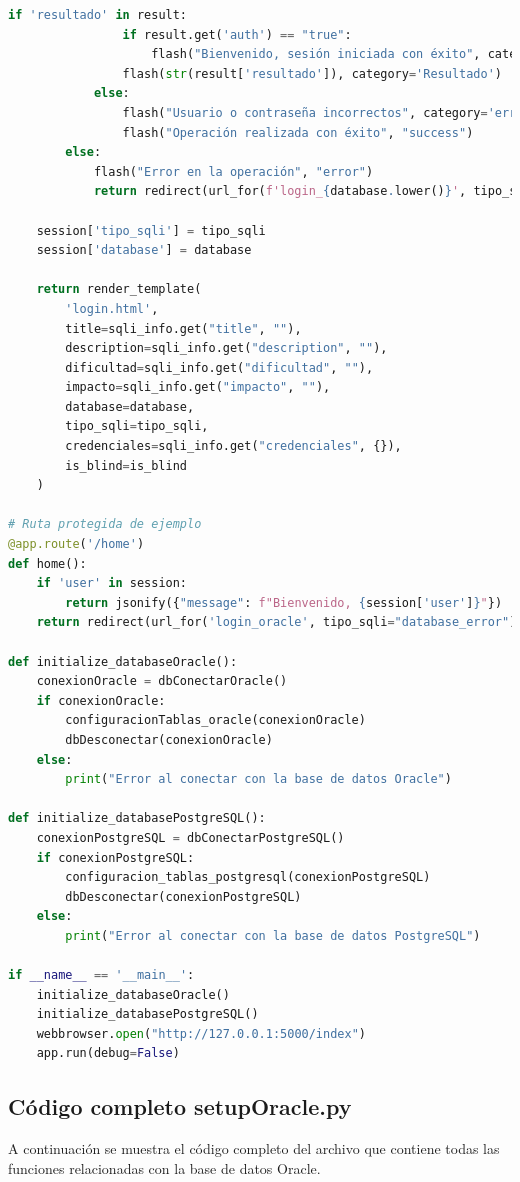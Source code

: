 \documentclass[a4paper,12pt]{article}
\begin{document}
\begin{lstlisting}[language=Python]
            if 'resultado' in result:
                if result.get('auth') == "true":
                    flash("Bienvenido, sesión iniciada con éxito", category='welcome')
                flash(str(result['resultado']), category='Resultado')
            else:
                flash("Usuario o contraseña incorrectos", category='error')
                flash("Operación realizada con éxito", "success")
        else:
            flash("Error en la operación", "error")
            return redirect(url_for(f'login_{database.lower()}', tipo_sqli=tipo_sqli))

    session['tipo_sqli'] = tipo_sqli
    session['database'] = database

    return render_template(
        'login.html',
        title=sqli_info.get("title", ""),
        description=sqli_info.get("description", ""),
        dificultad=sqli_info.get("dificultad", ""),
        impacto=sqli_info.get("impacto", ""),
        database=database,
        tipo_sqli=tipo_sqli,
        credenciales=sqli_info.get("credenciales", {}),
        is_blind=is_blind
    )

# Ruta protegida de ejemplo
@app.route('/home')
def home():
    if 'user' in session:
        return jsonify({"message": f"Bienvenido, {session['user']}"})
    return redirect(url_for('login_oracle', tipo_sqli="database_error"))

def initialize_databaseOracle():
    conexionOracle = dbConectarOracle()
    if conexionOracle:
        configuracionTablas_oracle(conexionOracle)
        dbDesconectar(conexionOracle)
    else:
        print("Error al conectar con la base de datos Oracle")

def initialize_databasePostgreSQL():
    conexionPostgreSQL = dbConectarPostgreSQL()
    if conexionPostgreSQL:
        configuracion_tablas_postgresql(conexionPostgreSQL)
        dbDesconectar(conexionPostgreSQL)
    else:
        print("Error al conectar con la base de datos PostgreSQL")

if __name__ == '__main__':
    initialize_databaseOracle()
    initialize_databasePostgreSQL()
    webbrowser.open("http://127.0.0.1:5000/index")
    app.run(debug=False)
\end{lstlisting}

\subsection{Código completo setupOracle.py}

A continuación se muestra el código completo del archivo que contiene todas las funciones relacionadas con la base de datos Oracle.
\end{document}
